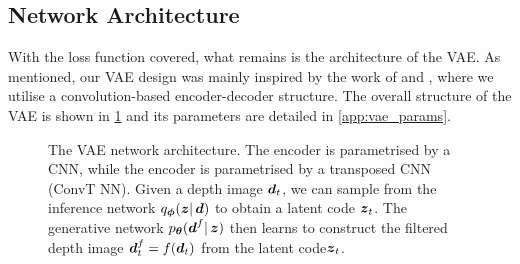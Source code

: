 \subsection{Network Architecture}
\label{subsec:5_vae_architecture}
With the loss function covered, what remains is the architecture of the VAE. As mentioned, our VAE design was mainly inspired by the work of \cite{deepCollisionPredictorOracle} and \cite{vae_decoder_architecture}, where we utilise a convolution-based encoder-decoder structure.
The overall structure of the VAE is shown in \cref{fig:5_vae} and its parameters are detailed in \cref{app:vae_params}.
\begin{figure}[hbt]
    \centering
    \caption{The VAE network architecture. The encoder is parametrised by a CNN, while the encoder is parametrised by a transposed CNN (ConvT NN). Given a depth image ${\boldsymbol{d}}_t$, we can sample from the inference network $q_{\boldsymbol{\phi}}(\boldsymbol{z} |\, {\boldsymbol{d}})$ to obtain a latent code ${\boldsymbol{z}}_t$. The generative network $p_{\boldsymbol{\theta}}({\boldsymbol{d}}^f |\, \boldsymbol{z})$ then learns to construct the filtered depth image ${\boldsymbol{d}}^f_t = f({\boldsymbol{d}}_t)$ from the latent code${\boldsymbol{z}}_t$.}
    \label{fig:5_vae}
\end{figure}

